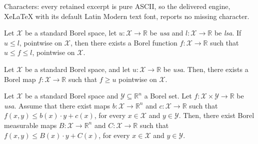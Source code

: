 \documentclass[10pt,a4paper]{amsart}
\newcommand{\R}{\mathbb R}
\newcommand{\X}{\mathcal X}
\newcommand{\Y}{\mathcal Y}
\newcommand{\lsa}{\emph{lsa}\xspace}
\newcommand{\usa}{\emph{usa}\xspace}
\begin{document}
Characters: every retained excerpt is pure ASCII, so the delivered engine, XeLaTeX with its default Latin Modern text font, reports no missing character.
\begin{lemma}\label{lemma:sandwich}
Let $\X$ be a standard Borel space, let $u:\X\to\R$ be \usa and $l:\X\to\R$ be \lsa. If $u\leq l$, pointwise on $\X$, then there exists a Borel function $f:\X\to\R$ such that $u\leq f\leq l$, pointwise on $\X$.
\end{lemma}

\begin{lemma}\label{lemma:novikov}
Let $\X$ be a standard Borel space, and let $u:\X\to\R$ be \usa. Then, there exists a Borel map $f:\X\to\R$ such that $f\geq u$ pointwise on $\X$.
\end{lemma}

\begin{theorem}\label{thm:main}
    Let $\X$ be a standard Borel space and $\Y\subseteq\R^n$ a Borel set. Let $f:\X\times \Y\to\R$ be \usa. Assume that there exist maps $b:\X\to\R^n$ and $c:\X\to\R$ such that $f(x,y)\leq b(x)\cdot y  +c(x)$, for every $x\in\X$ and $y\in \Y$. Then, there exist Borel measurable maps $B:\X\to\R^n$ and $C:\X\to\R$ such that
    $f(x,y)\leq B(x)\cdot y  +C(x)$, for every $x\in\X$ and $y\in\Y$.
\end{theorem}
\end{document}
